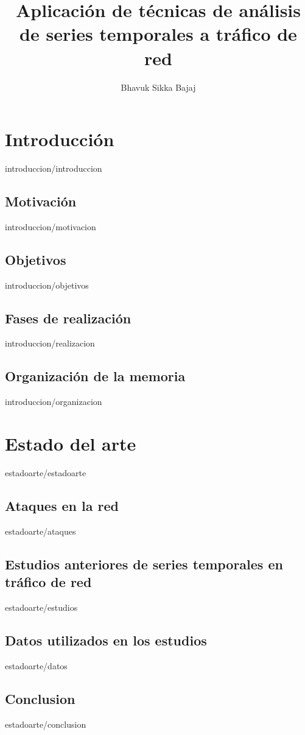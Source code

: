 \documentclass[epsbased,copyright,final,printable,covers,extendedindex,firstnumbered,tfg,gnuplot]{tfgtfmthesisuam}
\title{Aplicación de técnicas de análisis de series temporales a tráfico de red}
\author{Bhavuk Sikka Bajaj}
\begin{document}


\chapter{Introducción\label{CAP:INTRODUCCION}}{introduccion/introduccion}
  \section{Motivación\label{SEC:MOTIVACION}}{introduccion/motivacion}
  \section{Objetivos\label{SEC:OBJETIVOS}}{introduccion/objetivos}
  \section{Fases de realización\label{SEC:REALIZACION}}{introduccion/realizacion}
  \section{Organización de la memoria\label{SEC:ORGANIZACION}}{introduccion/organizacion}

\chapter{Estado del arte\label{CAP:ESTADOARTE}}{estadoarte/estadoarte}
  \section{Ataques en la red\label{SEC:ATAQUES}}{estadoarte/ataques}
  \section{Estudios anteriores de series temporales en tráfico de red\label{SEC:ESTUDIOS}}{estadoarte/estudios} %
  \section{Datos utilizados en los estudios\label{SEC:DATOS}}{estadoarte/datos}
  \section{Conclusion\label{SEC:EACONCLUSION}}{estadoarte/conclusion}
\end{document}
